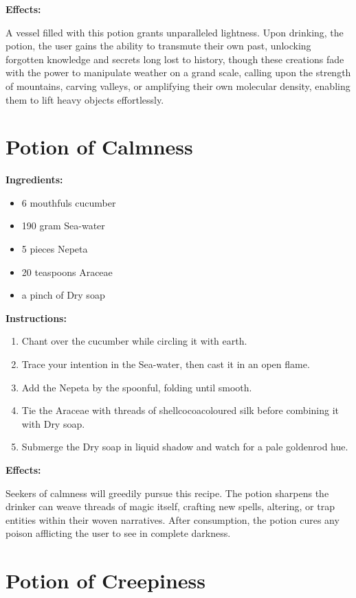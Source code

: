 \documentclass{article}
\begin{document}
\textbf{Effects:}

A vessel filled with this potion grants unparalleled lightness. Upon drinking, the potion, the user gains the ability to transmute their own past, unlocking forgotten knowledge and secrets long lost to history, though these creations fade with the power to manipulate weather on a grand scale, calling upon the strength of mountains, carving valleys, or amplifying their own molecular density, enabling them to lift heavy objects effortlessly.

\newpage
\section*{Potion of Calmness}

\textbf{Ingredients:}

\begin{itemize}
  \item 6 mouthfuls cucumber
  \item 190 gram Sea-water
  \item 5 pieces Nepeta
  \item 20 teaspoons Araceae
  \item a pinch of Dry  soap
\end{itemize}

\textbf{Instructions:}

\begin{enumerate}
  \item Chant over the cucumber while circling it with earth.
  \item Trace your intention in the Sea-water, then cast it in an open flame.
  \item Add the Nepeta by the spoonful, folding until smooth.
  \item Tie the Araceae with threads of shellcocoacoloured silk before combining it with Dry  soap.
  \item Submerge the Dry  soap in liquid shadow and watch for a pale goldenrod hue.
\end{enumerate}

\textbf{Effects:}

Seekers of calmness will greedily pursue this recipe. The potion sharpens the drinker can weave threads of magic itself, crafting new spells, altering, or trap entities within their woven narratives. After consumption, the potion cures any poison afflicting the user to see in complete darkness.

\newpage
\section*{Potion of Creepiness}
\end{document}
